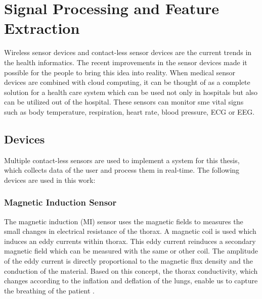 \chapter{Signal Processing and Feature Extraction}

Wireless sensor devices and contact-less sensor devices are the current trends in the health informatics. The recent improvements in the sensor devices made it possible for the people to bring this idea
into reality. When  medical sensor devices are combined with cloud computing, it can be thought of as a complete
solution for a health care system which can be used not only
in hospitals but also can be utilized out of the hospital.
These sensors can monitor sme vital signs such as body temperature, respiration, heart rate, blood pressure, ECG or EEG.

\section{Devices}

Multiple contact-less sensors are used to implement a system for this thesis, which collects data of the user and process them in real-time. The following devices are used in this work:

\subsection{Magnetic Induction Sensor}

The magnetic induction (MI) sensor uses the magnetic fields to measures the small changes in electrical resistance of the thorax. A magnetic coil is used which induces an eddy currents within thorax. This eddy current reinduces a secondary magnetic field which can be measured with the same or other coil. The amplitude of the eddy current is directly proportional to the magnetic flux density and the conduction of the material. Based on this concept, the thorax conductivity, which changes according to the inflation and deflation of the lungs, enable us to capture the breathing of the patient \cite{1742-6596-434-1-012085}. 

